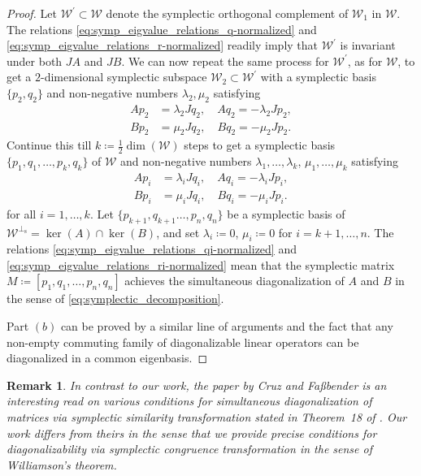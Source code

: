 \documentclass[preprint,12pt]{elsarticle}
\newtheorem{remark}[theorem]{Remark}
\begin{document}
\begin{proof}
    Let $\mathscr{W}^{\prime} \subset \mathscr{W}$ denote the symplectic orthogonal complement of $\mathscr{W}_1$ in $\mathscr{W}$.
    The relations \eqref{eq:symp_eigvalue_relations_q-normalized} and \eqref{eq:symp_eigvalue_relations_r-normalized} readily imply that $\mathscr{W}^{\prime}$ is invariant under both $JA$ and $JB$.
    We can now repeat the same process for $\mathscr{W}^\prime$, as for $\mathscr{W}$, to get a $2$-dimensional symplectic subspace $\mathscr{W}_2 \subset \mathscr{W}^{\prime}$ with a symplectic basis $\{p_2, q_2\}$ and non-negative numbers $\lambda_2, \mu_2$ satisfying
    \begin{align}
        A p_2 &= \lambda_2 J q_2, \quad A q_2 =  - \lambda_2 J p_2, \\
        B p_2 &= \mu_2 J q_2, \quad B q_2 =  -\mu_2 J p_2.
    \end{align}
    Continue this till $k \coloneqq \frac{1}{2}\operatorname{dim}(\mathscr{W})$ steps to get a symplectic basis $\{p_1, q_1,\ldots, p_k,q_k\}$ of $\mathscr{W}$ and non-negative numbers $\lambda_1,\ldots, \lambda_k$, $\mu_1,\ldots, \mu_k$ satisfying
    \begin{align}
        A p_i &= \lambda_i J q_i, \quad A q_i =  - \lambda_i J p_i, \label{eq:symp_eigvalue_relations_qi-normalized} \\
        B p_i &= \mu_i J q_i, \quad B q_i =  -\mu_i J p_i.
        \label{eq:symp_eigvalue_relations_ri-normalized}
    \end{align}
    for all $i=1,\ldots, k$.
    Let $\{p_{k+1}, q_{k+1}\ldots, p_{n}, q_n\}$ be a symplectic basis of $\mathscr{W}^{\perp_{\operatorname{s}}}= \operatorname{ker}(A) \cap \operatorname{ker}(B)$, and set $\lambda_i\coloneqq 0$, $\mu_i \coloneqq 0$ for $i=k+1,\ldots, n$.
    The relations \eqref{eq:symp_eigvalue_relations_qi-normalized} and \eqref{eq:symp_eigvalue_relations_ri-normalized} mean that the symplectic matrix $M \coloneqq [p_1, q_1, \ldots, p_n, q_n]$ achieves the simultaneous diagonalization of $A$ and $B$ in the sense of \eqref{eq:symplectic_decomposition}.

    Part $(b)$ can be proved by a similar line of arguments and the fact that any non-empty commuting family of diagonalizable linear operators can be diagonalized in a common eigenbasis.
    \end{proof}

\begin{remark}
        In contrast to our work, the paper by Cruz and Faßbender \cite{DELACRUZ2016288} is an interesting read on various conditions for simultaneous diagonalization of matrices via symplectic similarity transformation stated in Theorem~18 of \cite{DELACRUZ2016288}. 
        Our work differs from theirs in the sense that we provide precise conditions for diagonalizability via symplectic \emph{congruence transformation} in the sense of Williamson's theorem.
    \end{remark}
\end{document}

